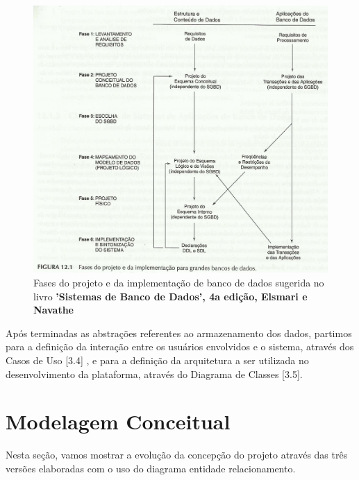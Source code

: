 \documentclass[graduacao,brazil]{ThesisPUC}
\begin{document}
\begin{figure}[H]
    \centering
    \includegraphics[width=\linewidth]{Imagens/fases_projeto_banco_dados.jpg}
    \caption{Fases do projeto e da implementação de banco de dados sugerida no livro 
	     \textbf{'Sistemas de Banco de Dados', 4a edição, Elsmari e Navathe}}
\end{figure}

Ap\'{o}s terminadas as abstra\c{c}\~{o}es referentes ao armazenamento dos dados, partimos para a
defini\c{c}\~{a}o da intera\c{c}\~{a}o entre os usu\'{a}rios envolvidos e o sistema, atrav\'{e}s dos Casos de Uso [3.4]
\cite{Larman04}, e para a defini\c{c}\~{a}o da arquitetura a ser utilizada no desenvolvimento da plataforma, atrav\'{e}s do
Diagrama de Classes [3.5].


\section{Modelagem Conceitual}

Nesta se\c{c}\~{a}o, vamos mostrar a evolu\c{c}\~{a}o da concep\c{c}\~{a}o do projeto atrav\'{e}s das tr\^{e}s vers\~{o}es
elaboradas com o uso do diagrama entidade relacionamento.
\end{document}
